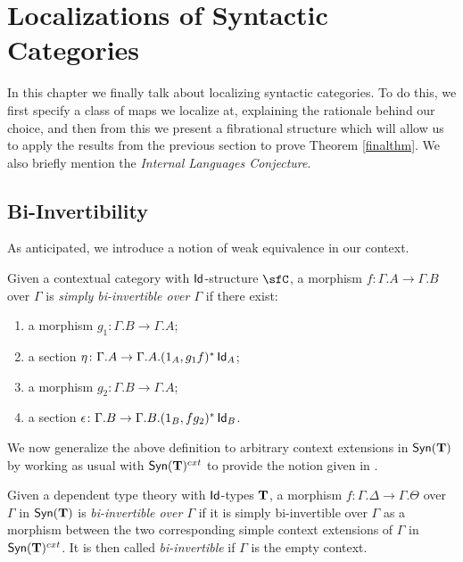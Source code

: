 \chapter{Localizations of Syntactic Categories}

In this chapter we finally talk about localizing syntactic categories. To do
this, we first specify a class of maps we localize at, explaining the rationale
behind our choice, and then from this we present a fibrational structure which
will allow us to apply the results from the previous section to prove
Theorem \ref{finalthm}. We also briefly mention the \emph{Internal Languages
Conjecture}.

\section{Bi-Invertibility}

As anticipated, we introduce a notion of weak equivalence in our context.

\begin{defn}
  Given a contextual category with $\operatorname{\mathsf{Id}}$-structure $\sfC$, a morphism
  $f\colon\Gamma.A\rightarrow\Gamma.B$ over $\Gamma$ is \emph{simply
    bi-invertible over $\Gamma$} if there exist:
  \begin{enumerate}
    \item a morphism $g_1\colon\Gamma.B\rightarrow\Gamma.A$;
    \item a section
      $\eta\colon\Gamma.A\rightarrow\Gamma.A.(1_{A},g_1f)^*\operatorname{\mathsf{Id}}_{A}$;
    \item a morphism $g_2\colon\Gamma.B\rightarrow\Gamma.A$;
    \item a section
      $\epsilon\colon\Gamma.B\rightarrow\Gamma.B.(1_{B},fg_2)^*\operatorname{\mathsf{Id}}_{B}$.
  \end{enumerate}
\end{defn}

We now generalize the above definition to arbitrary context extensions in
$\mathsf{Syn}(\mathbf{T})$ by working as usual with $\mathsf{Syn}(\mathbf{T})^{cxt}$ to provide the notion given
in \cite[Def.~1.4]{Kap17}.

\begin{defn}
  Given a dependent type theory with $\operatorname{\mathsf{Id}}$-types $\operatorname{\mathbf{T}}$, a morphism
  $f\colon\Gamma.\Delta\rightarrow\Gamma.\Theta$ over $\Gamma$ in $\mathsf{Syn}(\mathbf{T})$ is
  \emph{bi-invertible over $\Gamma$} if it is simply bi-invertible over $\Gamma$
  as a morphism between the two corresponding simple context extensions of
  $\Gamma$ in $\mathsf{Syn}(\mathbf{T})^{cxt}$. It is then called \emph{bi-invertible} if
  $\Gamma$ is the empty context.
\end{defn}

